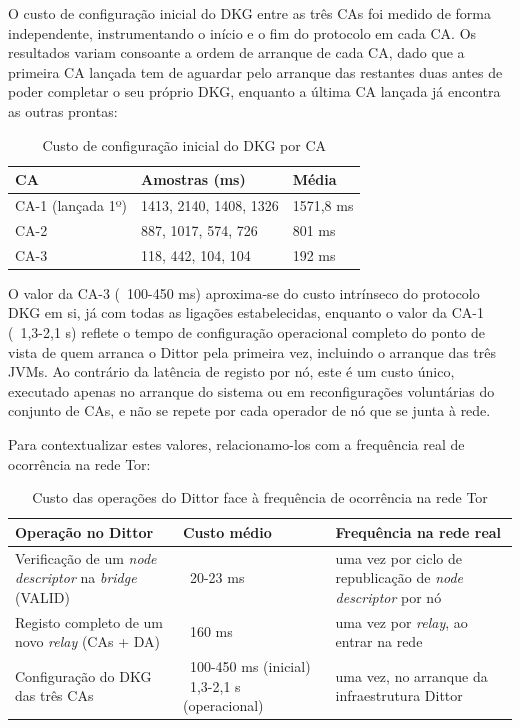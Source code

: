 O custo de configuração inicial do DKG entre as três CAs foi medido de forma independente, instrumentando o início e o fim do protocolo em cada CA. Os resultados variam consoante a ordem de arranque de cada CA, dado que a primeira CA lançada tem de aguardar pelo arranque das restantes duas antes de poder completar o seu próprio DKG, enquanto a última CA lançada já encontra as outras prontas:

\begin{table}[h]
    \centering
    \renewcommand{\arraystretch}{1.4}
    \begin{tabular}{|p{}|p{}|p{}|}
    \hline
    \textbf{CA} & \textbf{Amostras (ms)} & \textbf{Média} \\
    \hline
    CA-1 (lançada 1º) & 1413, 2140, 1408, 1326 & 1571,8 ms \\
    \hline
    CA-2 & 887, 1017, 574, 726 & 801 ms \\
    \hline
    CA-3 & 118, 442, 104, 104 & 192 ms \\
    \hline
    \end{tabular}
    \caption{Custo de configuração inicial do DKG por CA}
    \label{tab:custo_dkg}
\end{table}

O valor da CA-3 (~100-450 ms) aproxima-se do custo intrínseco do protocolo DKG em si, já com todas as ligações estabelecidas, enquanto o valor da CA-1 (~1,3-2,1 s) reflete o tempo de configuração operacional completo do ponto de vista de quem arranca o Dittor pela primeira vez, incluindo o arranque das três JVMs. Ao contrário da latência de registo por nó, este é um custo único, executado apenas no arranque do sistema ou em reconfigurações voluntárias do conjunto de CAs, e não se repete por cada operador de nó que se junta à rede.

Para contextualizar estes valores, relacionamo-los com a frequência real de ocorrência na rede Tor:

\begin{table}[h]
    \centering
    \renewcommand{\arraystretch}{1.4}
    \begin{tabular}{|p{}|p{}|p{}|}
    \hline
    \textbf{Operação no Dittor} & \textbf{Custo médio} & \textbf{Frequência na rede real} \\
    \hline
    Verificação de um \textit{node descriptor} na \textit{bridge} (VALID) & ~20-23 ms & uma vez por ciclo de republicação de \textit{node descriptor} por nó \\
    \hline
    Registo completo de um novo \textit{relay} (CAs + DA) & ~160 ms & uma vez por \textit{relay}, ao entrar na rede \\
    \hline
    Configuração do DKG das três CAs & ~100-450 ms (inicial) \newline ~1,3-2,1 s (operacional) & uma vez, no arranque da infraestrutura Dittor \\
    \hline
    \end{tabular}
    \caption{Custo das operações do Dittor face à frequência de ocorrência na rede Tor}
    \label{tab:custo_vs_frequencia}
\end{table}

